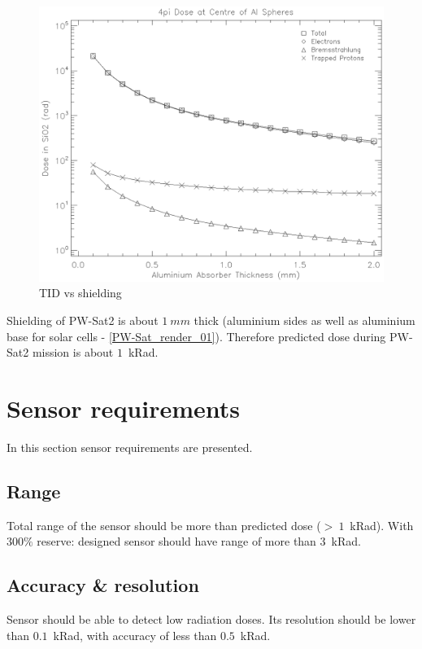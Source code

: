 	\begin{figure}[H]
		\centering
		\includegraphics[width=0.7\paperwidth]{img/dose.eps}
		\caption{TID vs shielding}
		\label{TIDvsSheilding}
	\end{figure}

	Shielding of PW-Sat2 is about $1~mm$ thick (aluminium sides as well as aluminium base for solar cells - \ref{PW-Sat_render_01}). Therefore predicted dose during PW-Sat2 mission is about $1$~kRad.




\section{Sensor requirements}
	In this section sensor requirements are presented.

\subsection{Range}
	Total range of the sensor should be more than predicted dose ($>~1$~kRad). With $300\%$ reserve: designed sensor should have range of more than $3$~kRad.
	
\subsection{Accuracy \& resolution}
	Sensor should be able to detect low radiation doses. Its resolution should be lower than $0.1$~kRad, with accuracy of less than $0.5$~kRad.




